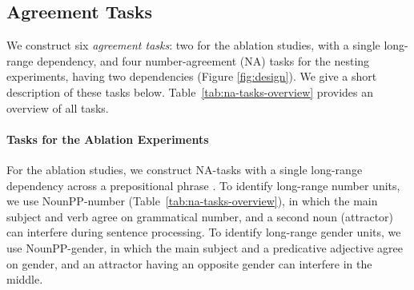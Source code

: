 \subsection{Agreement Tasks}
We construct six \emph{agreement tasks}: two for the ablation studies, with a single long-range dependency, and four number-agreement (NA) tasks for the nesting experiments, having two dependencies (Figure \ref{fig:design}). We give a short description of these tasks below. Table~\ref{tab:na-tasks-overview} provides an overview of all tasks. 



\paragraph{Tasks for the Ablation Experiments} For the ablation studies, we construct NA-tasks with a single long-range dependency across a prepositional phrase \citep{lakretz2019emergence}. To identify long-range number units, we use NounPP-number (Table~\ref{tab:na-tasks-overview}), in which the main subject and verb agree on grammatical number, and a second noun (attractor) can interfere during sentence processing. To identify long-range gender units, we use NounPP-gender, in which the main subject and a predicative adjective agree on gender, and an attractor having an opposite gender can interfere in the middle. 

